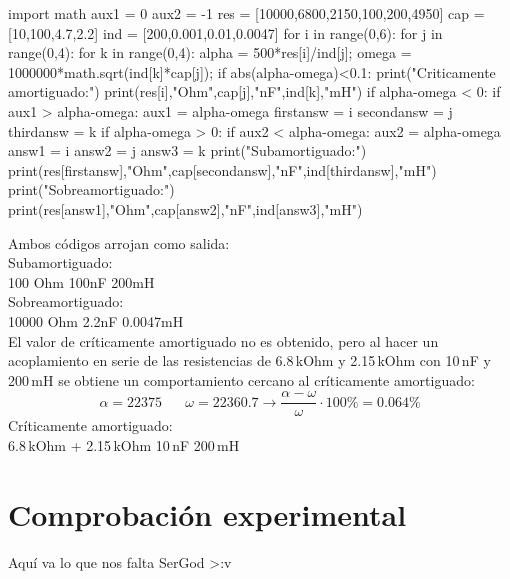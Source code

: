 \documentclass[a4paper,12pt]{report}
\begin{document}
\begin{pyglist}[language=python,caption={Python},listingname={\textbf{Circuito transitorio}},style=tango]
import math
aux1 = 0
aux2 = -1
res = [10000,6800,2150,100,200,4950]
cap = [10,100,4.7,2.2]
ind = [200,0.001,0.01,0.0047]
for i in range(0,6):
    for j in range(0,4):
        for k in range(0,4):
            alpha = 500*res[i]/ind[j];
            omega = 1000000*math.sqrt(ind[k]*cap[j]);
            if abs(alpha-omega)<0.1:
                print("Criticamente amortiguado:")
                print(res[i],"Ohm",cap[j],"nF",ind[k],"mH")
            if alpha-omega < 0:
                if aux1 > alpha-omega:
                    aux1 = alpha-omega
                    firstansw = i
                    secondansw = j
                    thirdansw = k
            if alpha-omega > 0:
                if aux2 < alpha-omega:
                    aux2 = alpha-omega
                    answ1 = i
                    answ2 = j
                    answ3 = k
print("Subamortiguado:")
print(res[firstansw],"Ohm",cap[secondansw],"nF",ind[thirdansw],"mH")
print("Sobreamortiguado:")
print(res[answ1],"Ohm",cap[answ2],"nF",ind[answ3],"mH")
\end{pyglist}
Ambos códigos arrojan como salida:\\
Subamortiguado:\\
100 Ohm \hspace{10pt} 100nF \hspace{10pt} 200mH\\
Sobreamortiguado:\\
10000 Ohm \hspace{10pt} 2.2nF \hspace{10pt} 0.0047mH\\
El valor de críticamente amortiguado no es obtenido, pero al hacer un acoplamiento en serie de las resistencias de 6.8$\,$kOhm y 2.15$\,$kOhm con 10$\,$nF y 200$\,$mH se obtiene un comportamiento cercano al críticamente amortiguado:
$$
\alpha = 22375 \hspace{20pt} \omega = 22360.7 \longrightarrow \frac{\alpha - \omega}{\omega} \cdot 100\% = 0.064\%
$$
Críticamente amortiguado:\\
6.8$\,$kOhm + 2.15$\,$kOhm \hspace{10pt} 10$\,$nF \hspace{10pt} 200$\,$mH
\section{Comprobación experimental}
{\Huge Aquí va lo que nos falta SerGod >:v}
\end{document}

